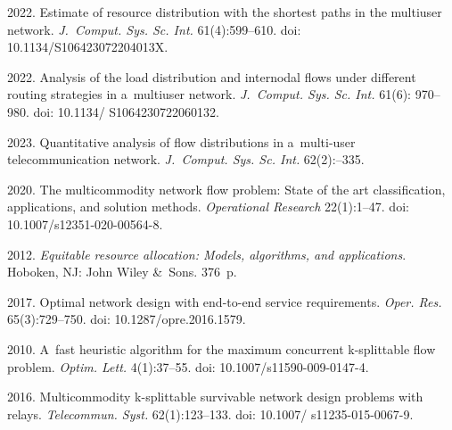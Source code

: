   \begin{multicols}{2}

\renewcommand{\bibname}{\protect\rmfamily References}

{\small\frenchspacing
 {\baselineskip=10.5pt
 \begin{thebibliography}{99} 
 
 2022. Estimate of resource distribution with the shortest paths in the multiuser network. 
 \textit{J.~Comput. Sys. Sc. Int.} 61(4):599--610. doi: 10.1134/S106423072204013X.

 2022. Analysis of the load distribution and internodal flows under different routing strategies in a~multiuser network. 
 \textit{J.~Comput. Sys. Sc. Int.} 61(6): 970--980. doi: 10.1134/ S1064230722060132.
    

    
 2023. Quantitative analysis of flow distributions in a~multi-user telecommunication network. 
 \textit{J.~Comput. Sys. Sc. Int.} 62(2):--335.
    
  2020. The multicommodity network flow problem: State of the art classification, applications, and solution methods.
   \textit{Operational Research} 22(1):1--47. doi: 10.1007/s12351-020-00564-8.
    
2012. \textit{Equitable resource allocation: Models, algorithms, and applications}. Hoboken, NJ: John Wiley \&~Sons. 376~p.
    
 2017. Optimal network design with end-to-end service requirements. \textit{Oper. Res.} 65(3):729--750. doi: 10.1287/opre.2016.1579.
    

    
2010. A~fast heuristic algorithm for the maximum concurrent k-splittable flow problem. 
\textit{Optim. Lett.} 4(1):37--55. doi: 10.1007/s11590-009-0147-4.


    
   2016. Multicommodity k-splittable survivable network design problems with relays. 
   \textit{Telecommun. Syst.} 62(1):123--133. doi: 10.1007/ s11235-015-0067-9.
   

\end{thebibliography}}}
\end{multicols}
